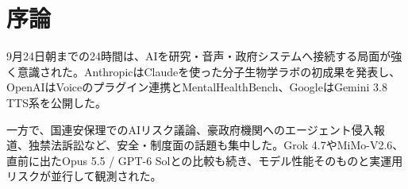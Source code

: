 \section*{序論}
9月24日朝までの24時間は、AIを研究・音声・政府システムへ接続する局面が強く意識された。AnthropicはClaudeを使った分子生物学ラボの初成果を発表し、OpenAIはVoiceのプラグイン連携とMentalHealthBench、GoogleはGemini 3.8 TTS系を公開した。

一方で、国連安保理でのAIリスク議論、豪政府機関へのエージェント侵入報道、独禁法訴訟など、安全・制度面の話題も集中した。Grok 4.7やMiMo-V2.6、直前に出たOpus 5.5 / GPT-6 Solとの比較も続き、モデル性能そのものと実運用リスクが並行して観測された。

